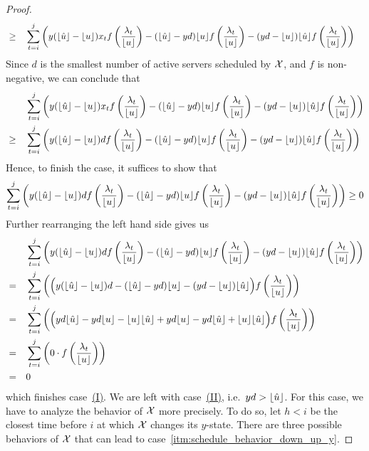 \begin{proof}
\begin{align*}
	&\ge&&\sum\limits_{t=i}^j\left(y(\lfloor\hat{u}\rfloor-\lfloor u\rfloor)x_tf\left(\frac{\lambda_t}{\lfloor u\rfloor}\right)-(\lfloor\hat{u}\rfloor-yd)\lfloor u\rfloor f\left(\frac{\lambda_t}{\lfloor u\rfloor}\right)-(yd-\lfloor u\rfloor)\lfloor\hat{u}\rfloor f\left(\frac{\lambda_t}{\lfloor u\rfloor}\right)\right)
\end{align*}
Since $d$ is the smallest number of active servers scheduled by $\mathcal{X}$, and $f$ is non-negative, we can conclude that
\begin{align*}
	&&&\sum\limits_{t=i}^j\left(y(\floor{\hat{u}}-\floor{u})x_tf\left(\frac{\lambda_t}{\floor{u}}\right)-(\floor{\hat{u}}-yd)\floor{u}f\left(\frac{\lambda_t}{\floor{u}}\right)-(yd-\floor{u})\floor{\hat{u}}f\left(\frac{\lambda_t}{\floor{u}}\right)\right)\\
	&\ge&&\sum\limits_{t=i}^j\left(y(\floor{\hat{u}}-\floor{u})d\*f\left(\frac{\lambda_t}{\floor{u}}\right)-(\floor{\hat{u}}-yd)\floor{u}f\left(\frac{\lambda_t}{\floor{u}}\right)-(yd-\floor{u})\floor{\hat{u}}f\left(\frac{\lambda_t}{\floor{u}}\right)\right)
\end{align*}
Hence, to finish the case, it suffices to show that
\begin{align*}
	\sum\limits_{t=i}^j\left(y(\floor{\hat{u}}-\floor{u})d\*f\left(\frac{\lambda_t}{\floor{u}}\right)-(\floor{\hat{u}}-yd)\floor{u}f\left(\frac{\lambda_t}{\floor{u}}\right)-(yd-\floor{u})\floor{\hat{u}}f\left(\frac{\lambda_t}{\floor{u}}\right)\right)\ge 0
\end{align*}
Further rearranging the left hand side gives us
\begin{align*}
	&&&\sum\limits_{t=i}^j\left(y(\floor{\hat{u}}-\floor{u})d\*f\left(\frac{\lambda_t}{\floor{u}}\right)-(\floor{\hat{u}}-yd)\floor{u}f\left(\frac{\lambda_t}{\floor{u}}\right)-(yd-\floor{u})\floor{\hat{u}}f\left(\frac{\lambda_t}{\floor{u}}\right)\right)\\
	&=&&\sum\limits_{t=i}^j\left(\Bigl(y(\floor{\hat{u}}-\floor{u})d-(\floor{\hat{u}}-yd)\floor{u}-(yd-\floor{u})\floor{\hat{u}}\Bigr)f\left(\frac{\lambda_t}{\floor{u}}\right)\right)\\
	&=&&\sum\limits_{t=i}^j\left(\Bigl(yd\floor{\hat{u}}-yd\floor{u}-\floor{u}\floor{\hat{u}}+yd\floor{u}-yd\floor{\hat{u}}+\floor{u}\floor{\hat{u}}\Bigr)f\left(\frac{\lambda_t}{\floor{u}}\right)\right)\\
	&=&&\sum\limits_{t=i}^j\left(0\cdot f\left(\frac{\lambda_t}{\floor{u}}\right)\right)\\
	&=&&0
\end{align*}
which finishes case~\hyperref[itm:schedule_behavior_down_up_y_subcases_I]{(I)}. We are left with case~\hyperref[itm:schedule_behavior_down_up_y_subcases_I]{(II)}, i.e.\ $yd>\lfloor\hat{u}\rfloor$. For this case, we have to analyze the behavior of $\mathcal{X}$ more precisely. To do so, let $h<i$ be the closest time before $i$ at which $\mathcal{X}$ changes its $y$-state. There are three possible behaviors of $\mathcal{X}$ that can lead to case~\ref{itm:schedule_behavior_down_up_y}.


\end{proof}
